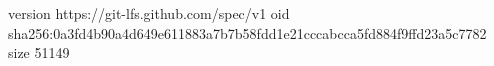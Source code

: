 version https://git-lfs.github.com/spec/v1
oid sha256:0a3fd4b90a4d649e611883a7b7b58fdd1e21cccabcca5fd884f9ffd23a5c7782
size 51149
